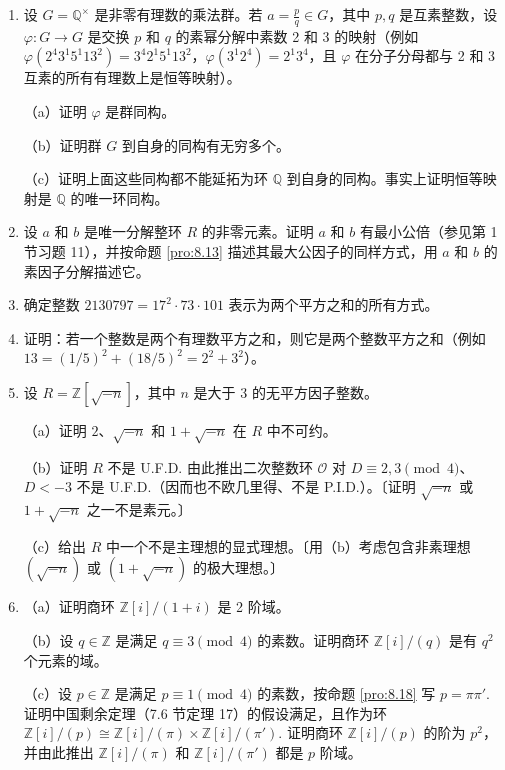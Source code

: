 \begin{enumerate}
\item 设 \(G = \mathbb{Q}^\times\) 是非零有理数的乘法群。若 \(a = \frac{p}{q} \in G\)，其中 \(p, q\) 是互素整数，设 \(\varphi : G \to G\) 是交换 \(p\) 和 \(q\) 的素幂分解中素数 2 和 3 的映射（例如 \(\varphi(2^4 3^1 5^1 13^2) = 3^4 2^1 5^1 13^2\)，\(\varphi(3^1 2^4) = 2^1 3^4\)，且 \(\varphi\) 在分子分母都与 2 和 3 互素的所有有理数上是恒等映射）。

（a）证明 \(\varphi\) 是群同构。

（b）证明群 \(G\) 到自身的同构有无穷多个。

（c）证明上面这些同构都不能延拓为环 \(\mathbb{Q}\) 到自身的同构。事实上证明恒等映射是 \(\mathbb{Q}\) 的唯一环同构。

\item 设 \(a\) 和 \(b\) 是唯一分解整环 \(R\) 的非零元素。证明 \(a\) 和 \(b\) 有最小公倍（参见第 1 节习题 11），并按命题 \ref{pro:8.13} 描述其最大公因子的同样方式，用 \(a\) 和 \(b\) 的素因子分解描述它。

\item 确定整数 \(2130797 = 17^2 \cdot 73 \cdot 101\) 表示为两个平方之和的所有方式。

\item 证明：若一个整数是两个有理数平方之和，则它是两个整数平方之和（例如 \(13 = (1/5)^2 + (18/5)^2 = 2^2+3^2\)）。

\item 设 \(R = \mathbb{Z}[\sqrt{-n}]\)，其中 \(n\) 是大于 3 的无平方因子整数。

（a）证明 \(2\)、\(\sqrt{-n}\) 和 \(1+\sqrt{-n}\) 在 \(R\) 中不可约。

（b）证明 \(R\) 不是 U.F.D. 由此推出二次整数环 \(\mathcal{O}\) 对 \(D \equiv 2, 3 \pmod 4\)、\(D < -3\) 不是 U.F.D.（因而也不欧几里得、不是 P.I.D.）。〔证明 \(\sqrt{-n}\) 或 \(1+\sqrt{-n}\) 之一不是素元。〕

（c）给出 \(R\) 中一个不是主理想的显式理想。〔用（b）考虑包含非素理想 \((\sqrt{-n})\) 或 \((1+\sqrt{-n})\) 的极大理想。〕

\item （a）证明商环 \(\mathbb{Z}[i]/(1+i)\) 是 2 阶域。

（b）设 \(q \in \mathbb{Z}\) 是满足 \(q \equiv 3 \pmod 4\) 的素数。证明商环 \(\mathbb{Z}[i]/(q)\) 是有 \(q^2\) 个元素的域。

（c）设 \(p \in \mathbb{Z}\) 是满足 \(p \equiv 1 \pmod 4\) 的素数，按命题 \ref{pro:8.18} 写 \(p = \pi\pi'\). 证明中国剩余定理（7.6 节定理 17）的假设满足，且作为环 \(\mathbb{Z}[i]/(p) \cong \mathbb{Z}[i]/(\pi) \times \mathbb{Z}[i]/(\pi')\). 证明商环 \(\mathbb{Z}[i]/(p)\) 的阶为 \(p^2\)，并由此推出 \(\mathbb{Z}[i]/(\pi)\) 和 \(\mathbb{Z}[i]/(\pi')\) 都是 \(p\) 阶域。


\end{enumerate}
